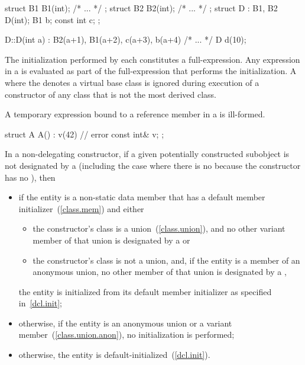 \begin{example}

\begin{codeblock}
struct B1 { B1(int); /* ... */ };
struct B2 { B2(int); /* ... */ };
struct D : B1, B2 {
  D(int);
  B1 b;
  const int c;
};

D::D(int a) : B2(a+1), B1(a+2), c(a+3), b(a+4)
  { /* ... */ }
D d(10);
\end{codeblock}
\end{example}
The initialization
performed by each 
constitutes a full-expression.
Any expression in
a
is evaluated as part of the full-expression that performs the initialization.
A  where the  denotes
a virtual base class is ignored during execution of a constructor of any class that is
not the most derived class.

\pnum
A temporary expression bound to a reference member in a 
is ill-formed.
\begin{example}
\begin{codeblock}
struct A {
  A() : v(42) { }  // error
  const int& v;
};
\end{codeblock}
\end{example}

\pnum
In a non-delegating constructor, if
a given potentially constructed subobject is not designated by a
(including the case where there is no
because the constructor has no
),
then

\begin{itemize}
\item if the entity is a non-static data member that has
a default member initializer~(\ref{class.mem}) and either

\begin{itemize}
\item the constructor's class is a union~(\ref{class.union}), and no other variant
member of that union is designated by a  or

\item the constructor's class is not a union, and, if the entity is a member of an
anonymous union, no other member of that union is designated by a
,
\end{itemize}

the entity is initialized from its default member initializer
as specified in~\ref{dcl.init};

\item otherwise, if the entity is an anonymous union or a variant member~(\ref{class.union.anon}), no initialization is performed;

\item otherwise, the entity is default-initialized~(\ref{dcl.init}).
\end{itemize}

